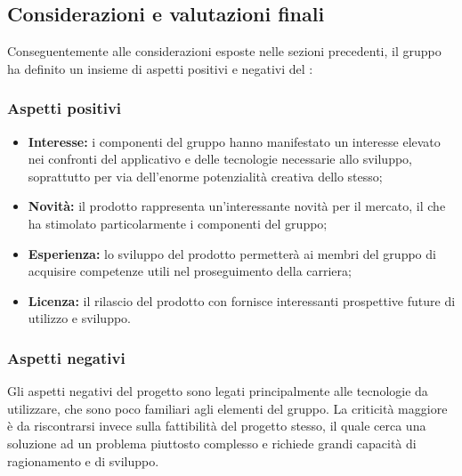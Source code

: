   \subsection{Considerazioni e valutazioni finali}
    Conseguentemente alle considerazioni esposte nelle sezioni precedenti, il gruppo ha definito un
    insieme di aspetti positivi e negativi del :
    \subsubsection{Aspetti positivi}
      \begin{itemize}
        \item \textbf{Interesse:} i componenti del gruppo hanno manifestato un interesse elevato nei confronti del  applicativo e delle tecnologie necessarie
        allo sviluppo, soprattutto per via dell'enorme potenzialità creativa dello stesso;
        \item \textbf{Novità:} il prodotto rappresenta un'interessante novità per il mercato, il che ha stimolato particolarmente i componenti del gruppo;
        \item \textbf{Esperienza:} lo sviluppo del prodotto permetterà ai membri del gruppo di acquisire competenze utili nel proseguimento della carriera;
        \item \textbf{Licenza:} il rilascio del prodotto con  fornisce interessanti
         prospettive future di utilizzo e sviluppo.
     \end{itemize}
   \subsubsection{Aspetti negativi}
    Gli aspetti negativi del progetto sono legati principalmente alle tecnologie da utilizzare, che sono poco familiari agli elementi del gruppo.
    La criticità maggiore è da riscontrarsi invece sulla fattibilità del progetto stesso, il quale cerca una soluzione ad un problema piuttosto complesso e richiede grandi
    capacità di ragionamento e di sviluppo.

